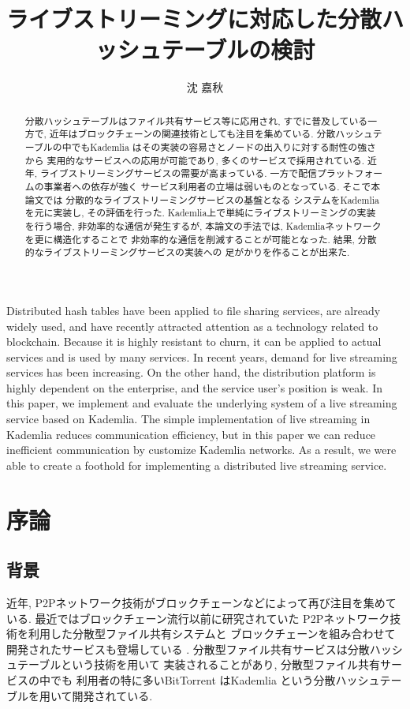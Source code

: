 \documentclass[sotsuron]{jcsie}
\title{ライブストリーミングに対応した分散ハッシュテーブルの検討}
\author{沈 嘉秋}
\begin{document}
\maketitle
\emaketitle
{}
\begin{abstract}    
分散ハッシュテーブルはファイル共有サービス等に応用され, 
すでに普及している一方で, 
近年はブロックチェーンの関連技術としても注目を集めている.
分散ハッシュテーブルの中でもKademlia
はその実装の容易さとノードの出入りに対する耐性の強さから
実用的なサービスへの応用が可能であり, 
多くのサービスで採用されている.
近年, ライブストリーミングサービスの需要が高まっている.
一方で配信プラットフォームの事業者への依存が強く
サービス利用者の立場は弱いものとなっている.
そこで本論文では
分散的なライブストリーミングサービスの基盤となる
システムをKademliaを元に実装し, その評価を行った.
Kademlia上で単純にライブストリーミングの実装を行う場合, 
非効率的な通信が発生するが, 本論文の手法では, 
Kademliaネットワークを更に構造化することで
非効率的な通信を削減することが可能となった.
結果, 分散的なライブストリーミングサービスの実装への
足がかりを作ることが出来た.
\end{abstract}
\begin{eabstract}
Distributed hash tables have been applied to file sharing services, 
are already widely used, and have recently attracted attention as a 
technology related to blockchain.
Because it is highly resistant to churn, it can be applied to actual services 
and is used by many services.
In recent years, demand for live streaming services has been increasing. 
On the other hand, the distribution platform is highly dependent on the enterprise,
and the service user's position is weak.
In this paper, we implement and evaluate the underlying system 
of a live streaming service based on Kademlia.
The simple implementation of live streaming in 
Kademlia reduces communication efficiency, but in this paper 
we can reduce inefficient communication by customize Kademlia networks.
As a result, we were able to create a foothold for implementing 
a distributed live streaming service.
\end{eabstract}
\setcounter{tocdepth}{2}
\tableofcontents
{}


\chapter{序論}
\section{背景}
\label{sec:haikei}
近年, P2Pネットワーク技術がブロックチェーンなどによって再び注目を集めている.
最近ではブロックチェーン流行以前に研究されていた
P2Pネットワーク技術を利用した分散型ファイル共有システムと
ブロックチェーンを組み合わせて開発されたサービスも登場している
\cite{BitTorre1:online}.
分散型ファイル共有サービスは分散ハッシュテーブルという技術を用いて
実装されることがあり, 分散型ファイル共有サービスの中でも
利用者の特に多いBitTorrent\cite{BitTorre59:online}
はKademlia\cite{maymounkov2002kademlia}\cite{高野祐輝2010nat}
という分散ハッシュテーブルを用いて開発されている.
\end{document}
